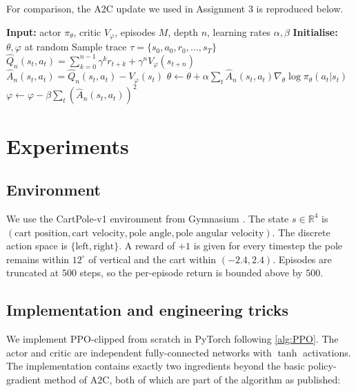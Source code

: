 \documentclass{article}
\theoremstyle{plain}
\theoremstyle{definition}
\theoremstyle{remark}
\begin{document}
For comparison, the A2C update we used in Assignment 3 is reproduced below.

\begin{algorithm}[H]
    \caption{Advantage Actor Critic (A2C); reproduced from Assignment 3}
    \begin{algorithmic}
        \STATE \textbf{Input:} actor $\pi_\theta$, critic $V_\varphi$, episodes $M$, depth $n$, learning rates $\alpha,\beta$
        \STATE \textbf{Initialise:} $\theta,\varphi$ at random
            \STATE Sample trace $\tau=\{s_0,a_0,r_0,\ldots,s_T\}$
                \STATE $\hat Q_n(s_t,a_t)=\sum_{k=0}^{n-1}\gamma^k r_{t+k}+\gamma^{n}V_\varphi(s_{t+n})$
                \STATE $\hat A_n(s_t,a_t)=\hat Q_n(s_t,a_t)-V_\varphi(s_t)$
            \ENDFOR
            \STATE $\theta\!\leftarrow\!\theta+\alpha\sum_t \hat A_n(s_t,a_t)\nabla_\theta\log\pi_\theta(a_t|s_t)$
            \STATE $\varphi\!\leftarrow\!\varphi-\beta\sum_t (\hat A_n(s_t,a_t))^{2}$
        \ENDFOR
    \end{algorithmic}
    \label{alg:A2C-ref}
\end{algorithm}

\section{Experiments}\label{sec:experiments}

\subsection{Environment}\label{sec:experiments:env}

We use the CartPole-v1 environment from Gymnasium \cite{Towers2024}. The state $s\in\mathbb{R}^{4}$ is $(\text{cart position},\text{cart velocity},\text{pole angle},\text{pole angular velocity})$. The discrete action space is $\{\text{left},\text{right}\}$. A reward of $+1$ is given for every timestep the pole remains within $12^{\circ}$ of vertical and the cart within $(-2.4,2.4)$. Episodes are truncated at $500$ steps, so the per-episode return is bounded above by $500$.

\subsection{Implementation and engineering tricks}\label{sec:experiments:impl}

We implement PPO-clipped from scratch in PyTorch following \autoref{alg:PPO}. The actor and critic are independent fully-connected networks with $\tanh$ activations. The implementation contains exactly two ingredients beyond the basic policy-gradient method of A2C, both of which are part of the algorithm as published:
\end{document}
